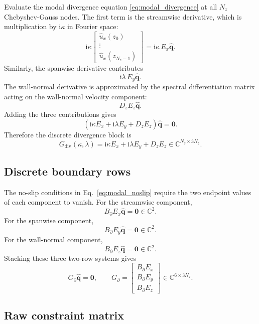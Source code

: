 \documentclass[11pt]{article}
\newcommand{\ii}{\mathrm{i}}
\newcommand{\bfq}{\bm{q}}
\newcommand{\bfzero}{\bm{0}}
\newcommand{\Gdiv}{G_{\mathrm{div}}}
\newcommand{\Gbdry}{G_{\partial}}
\newcommand{\Ez}{E_z}
\newcommand{\Ex}{E_x}
\newcommand{\Ey}{E_y}
\newcommand{\Dz}{D_z}
\newcommand{\Bbdry}{B_{\partial}}
\begin{document}
Evaluate the modal divergence equation
\eqref{eq:modal_divergence} at all \(N_z\) Chebyshev-Gauss nodes. The first
term is the streamwise derivative, which is multiplication by
\(\ii\kappa\) in Fourier space:
\[
  \ii\kappa
  \begin{bmatrix}
    \widehat{u}_x(z_0)\\
    \vdots\\
    \widehat{u}_x(z_{N_z-1})
  \end{bmatrix}
  =
  \ii\kappa\,\Ex\widehat{\bfq}.
\]
Similarly, the spanwise derivative contributes
\[
  \ii\lambda\,\Ey\widehat{\bfq}.
\]
The wall-normal derivative is approximated by the spectral differentiation
matrix acting on the wall-normal velocity component:
\[
  \Dz\Ez\widehat{\bfq}.
\]
Adding the three contributions gives
\begin{equation}
  \left(
    \ii\kappa\Ex
    + \ii\lambda\Ey
    + \Dz\Ez
  \right)\widehat{\bfq}
  =
  \bfzero.
  \label{eq:discrete_divergence_constraint}
\end{equation}
Therefore the discrete divergence block is
\begin{equation}
  \Gdiv(\kappa,\lambda)
  =
  \ii\kappa\Ex
  + \ii\lambda\Ey
  + \Dz\Ez
  \in\mathbb{C}^{N_z\times 3N_z}.
  \label{eq:Gdiv}
\end{equation}

\subsection{Discrete boundary rows}

The no-slip conditions in Eq.~\eqref{eq:modal_noslip} require the two endpoint
values of each component to vanish. For the streamwise component,
\[
  \Bbdry \Ex \widehat{\bfq}=\bfzero\in\mathbb{C}^{2}.
\]
For the spanwise component,
\[
  \Bbdry \Ey \widehat{\bfq}=\bfzero\in\mathbb{C}^{2}.
\]
For the wall-normal component,
\[
  \Bbdry \Ez \widehat{\bfq}=\bfzero\in\mathbb{C}^{2}.
\]
Stacking these three two-row systems gives
\begin{equation}
  \Gbdry\widehat{\bfq}=\bfzero,
  \qquad
  \Gbdry =
  \begin{bmatrix}
    \Bbdry\Ex\\
    \Bbdry\Ey\\
    \Bbdry\Ez
  \end{bmatrix}
  \in\mathbb{C}^{6\times 3N_z}.
  \label{eq:Gboundary}
\end{equation}

\subsection{Raw constraint matrix}
\end{document}
